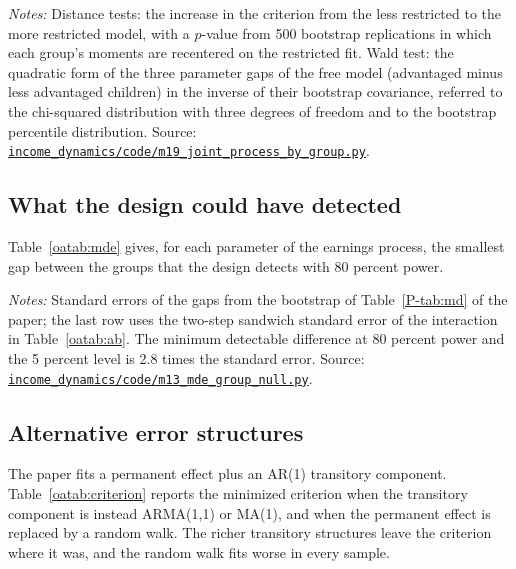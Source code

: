 \documentclass[11pt]{article}
\numberwithin{equation}{section}
\newcommand{\repourl}{https://github.com/JiachenJin1001/before-the-labor-market-or-inside-it}
\newcommand{\code}[1]{\href{\repourl/blob/main/#1}{\nolinkurl{#1}}}
\begin{document}
\begin{table}[tbp]
\centering
\small
\caption{Tests between the joint fits.}
\label{oatab:jointtests}

\par\smallskip
\begin{minipage}{0.92\textwidth}
\footnotesize\emph{Notes:} Distance tests: the increase in the criterion from the less restricted to the more restricted model, with a $p$-value from 500 bootstrap replications in which each group's moments are recentered on the restricted fit. Wald test: the quadratic form of the three parameter gaps of the free model (advantaged minus less advantaged children) in the inverse of their bootstrap covariance, referred to the chi-squared distribution with three degrees of freedom and to the bootstrap percentile distribution. Source: \code{income_dynamics/code/m19_joint_process_by_group.py}.
\end{minipage}
\end{table}

\subsection{What the design could have detected}

Table~\ref{oatab:mde} gives, for each parameter of the earnings process, the smallest gap between the groups that the design detects with 80 percent power.


\begin{table}[H]
\centering
\small
\caption{Minimum detectable differences between the two groups.}
\label{oatab:mde}

\par\smallskip
\begin{minipage}{0.92\textwidth}
\footnotesize\emph{Notes:} Standard errors of the gaps from the
bootstrap of Table~\ref{P-tab:md} of the paper; the last row uses the
two-step sandwich standard error of the interaction in
Table~\ref{oatab:ab}. The minimum detectable difference at
80 percent power and the 5 percent level is 2.8 times the standard
error. Source: \code{income_dynamics/code/m13_mde_group_null.py}.
\end{minipage}
\end{table}

\subsection{Alternative error structures}
\label{oa:errorstructures}

The paper fits a permanent effect plus an AR(1) transitory component.
Table~\ref{oatab:criterion} reports the minimized criterion when the
transitory component is instead ARMA(1,1) or MA(1), and when the
permanent effect is replaced by a random walk. The richer transitory
structures leave the criterion where it was, and the random walk fits
worse in every sample. 
\end{document}
